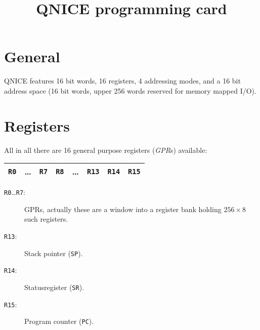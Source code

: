 \documentclass{leaflet}
\begin{document}
 \title{QNICE programming card}
 \maketitle
%
 \section{General}
  QNICE features 16 bit words, 16 registers, 4 addressing modes, and 
  a 16 bit address space (16 bit words, upper 256 words reserved for
  memory mapped I/O).
  \vspace*{-5mm}
%
 \section{Registers}
  All in all there are 16 general purpose registers (\emph{GPR}s) available:
  \begin{center}
   \vspace*{-2mm}
   \begin{longtable}{|c|c|c||c|c|c|c|c|}
    \hline
    {\tt R0}&\dots&{\tt R7}&{\tt R8}&\dots&{\tt R13}&{\tt R14}&{\tt R15}\\
    \hline
   \end{longtable}
   \vspace*{-9mm}
  \end{center}
  \begin{description}
   \item [\texttt{R0}\dots\texttt{R7}:] GPRs, actually 
    these are a window into a register bank holding $256\times 8$ such 
    registers.
   \item [\texttt{R13}:] Stack pointer (\texttt{SP}).
   \item [\texttt{R14}:] Statusregister (\texttt{SR}).
   \item [\texttt{R15}:] Program counter (\texttt{PC}).
  \end{description}
%
\end{document}
